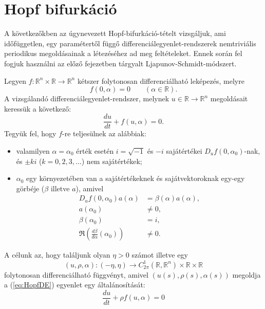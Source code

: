 \documentclass[oneside, titlepage, 12pt, a4paper]{report}
\begin{document}
\section{Hopf bifurkáció}
\label{sec:Hopfbifurcation}
A következőkben az úgynevezett Hopf-bifurkáció-tételt vizsgáljuk, ami időfüggetlen, egy paramétertől függő differenciálegyenlet-rendszerek nemtriviális periodikus megoldásainak a létezéséhez ad meg feltételeket. Ennek során fel fogjuk használni az előző fejezetben tárgyalt Ljapunov-Schmidt-módszert. \cite{chapter2chapter10} \par
Legyen $f : \mathbb{R}^n \times \mathbb{R} \rightarrow \mathbb{R}^n$ kétszer folytonosan differenciálható leképezés, melyre
\begin{equation*}
f(0, \alpha) = 0 \qquad (\alpha \in \mathbb{R}).
\end{equation*}
A vizsgálandó differenciálegyenlet-rendszer, melynek $u \in \mathbb{R} \rightarrow \mathbb{R}^n$ megoldásait keressük a következő:
\begin{equation}
\label{eq:HopfDE}
\frac{du}{dt} + f(u, \alpha) = 0.
\end{equation}
Tegyük fel, hogy $f$-re teljesülnek az alábbiak:
\begin{itemize}
\item
valamilyen $\alpha = \alpha_0$ érték esetén $i = \sqrt{-1}$ és $-i$ sajátértékei $D_uf(0, \alpha_0)$-nak, és $\pm ki$ ($k = 0, 2, 3, \dots$) nem sajátértékek;
\item
$\alpha_0$ egy környezetében van a sajátértékeknek és sajátvektoroknak egy-egy görbéje ($\beta$ illetve $a$), amivel
\begin{align}
D_uf(0, \alpha_0) a(\alpha) &= \beta(\alpha) a(\alpha), \\
a(\alpha_0) &\ne 0, \\
\beta(\alpha_0) &= i, \\
\Re(\frac{d\beta}{d\alpha}(\alpha_0)) &\ne 0.
\end{align}
\end{itemize}
A célunk az, hogy találjunk olyan $\eta > 0$ számot illetve egy
\begin{equation*}
(u, \rho, \alpha) : (-\eta, \eta) \rightarrow C_{2\pi}^1(\mathbb{R}, \mathbb{R}^n) \times \mathbb{R} \times \mathbb{R}
\end{equation*}
folytonosan differenciálható függvényt, amivel $(u(s), \rho(s), \alpha(s))$ megoldja a (\ref{eq:HopfDE}) egyenlet egy általánosítását:
\begin{equation}
\label{eq:HopfDErho}
\frac{du}{dt} + \rho f(u, \alpha) = 0
\end{equation}
\end{document}
